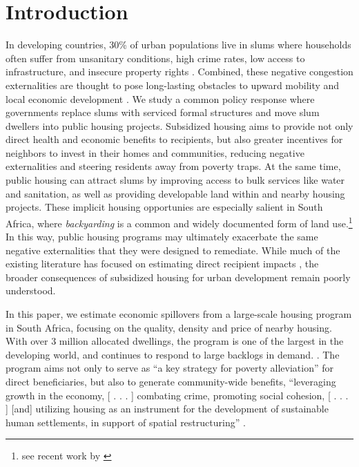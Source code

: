 \documentclass[12pt]{article}
\begin{document}
\doublespacing

\section{Introduction} \label{sec:introduction}

In developing countries, 30\% of urban populations live in slums where households often suffer from unsanitary conditions,  high crime rates, low access to infrastructure, and insecure property rights \citep{mdg}.  Combined, these negative congestion externalities are thought to pose long-lasting obstacles to upward mobility and local economic development \citep{10.1257/jep.27.4.187}. We study a common policy response where governments replace slums with serviced formal structures and move slum dwellers into public housing projects. Subsidized housing aims to provide not only direct health and economic benefits to recipients, but also greater incentives for neighbors to invest in their homes and communities, reducing negative externalities and steering residents away from poverty traps. At the same time, public housing can attract slums by improving access to bulk services like water and sanitation, as well as providing developable land within and nearby housing projects. These implicit housing opportunies are especially salient in South Africa, where {\it backyarding} is a common and widely documented form of land use.\footnote{see recent work by \cite{Brueckner2018backyarding}} In this way, public housing programs may ultimately exacerbate the same negative externalities that they were designed to remediate. While much of the existing literature has focused on estimating direct recipient impacts \citep{cattaneo2009housing,franklin2016enabled,galiani2017shelter}, the broader consequences of subsidized housing for urban development remain poorly understood.



In this paper, we estimate economic spillovers from a large-scale housing program in South Africa, focusing on the quality, density and price of nearby housing. With over 3 million allocated dwellings, the program is one of the largest in the developing world, and continues to respond to large backlogs in demand. \citep{dhsreports}. The program aims not only to serve as ``a key strategy for poverty alleviation'' for direct beneficiaries, but also to generate community-wide benefits, ``leveraging growth in the economy, [ . . . ] combating crime, promoting social cohesion, [ . . . ] [and] utilizing housing as an instrument for the development of sustainable human settlements, in support of spatial restructuring'' \citep{bng}. 
\end{document}
